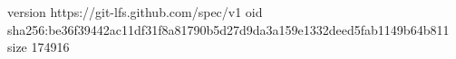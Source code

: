 version https://git-lfs.github.com/spec/v1
oid sha256:be36f39442ac11df31f8a81790b5d27d9da3a159e1332deed5fab1149b64b811
size 174916
